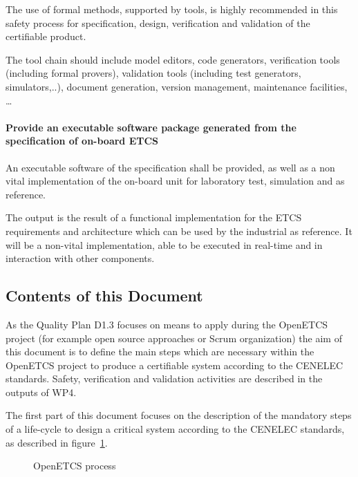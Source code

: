 The use of formal methods, supported by tools, is highly recommended in this safety process for specification, design, verification and validation of the certifiable product.

The tool chain should include model editors, code generators, verification tools (including formal provers), validation tools (including test generators, simulators,..), document generation, version management, maintenance facilities, \dots

\paragraph{Provide an executable software package generated from the specification of on-board ETCS}

An executable software of the specification shall be provided, as well as a non vital implementation of the on-board unit for laboratory test, simulation and as reference.

The output is the result of a functional implementation for the ETCS requirements and architecture which can be used by the industrial as reference. It will be a non-vital  implementation, able to be executed in real-time and in interaction with other components.


\subsection{Contents of this Document}

As the Quality Plan D1.3 focuses on means to apply during the OpenETCS project (for example open source approaches or Scrum organization) the aim of this document is to define the main steps which are necessary within the OpenETCS project to produce a certifiable system according to the CENELEC standards.
Safety, verification and validation activities are described in the outputs of WP4.


The first part of this document focuses on the description of the mandatory steps of a life-cycle to design a critical system according to the CENELEC standards, as described in figure~\ref{fig:OETCSProcess}.

\begin{figure}[h]
  \centering
  \caption{OpenETCS process}
  \label{fig:OETCSProcess}
\end{figure}


